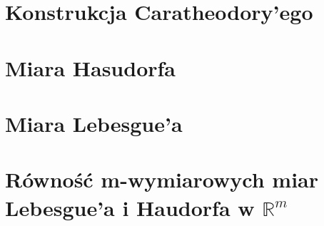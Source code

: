 
\section{Konstrukcja Caratheodory'ego}

\bigbreak

\bigbreak


\section{Miara Hasudorfa}

\bigbreak

\bigbreak

\bigbreak

\bigbreak

\section{Miara Lebesgue'a}

\bigbreak

\bigbreak

\bigbreak

\section{Równość m-wymiarowych miar Lebesgue'a i Haudorfa w $\mathbb{R}^m$ }
%
%
%

\bigbreak